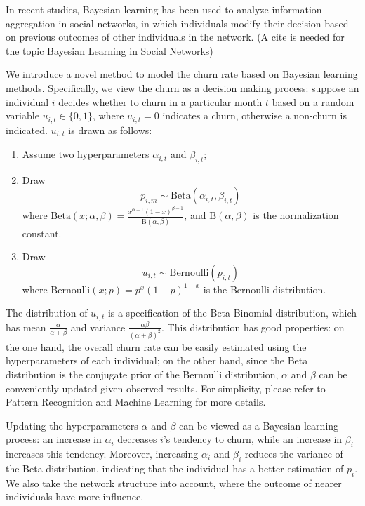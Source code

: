 In recent studies, Bayesian learning has been used to analyze information aggregation in social networks, in which individuals modify their decision based on previous outcomes of other individuals in the network. (A cite is needed for the topic Bayesian Learning in Social Networks)

We introduce a novel method to model the churn rate based on Bayesian learning methods. Specifically, we view the churn as a decision making process: suppose an individual $i$ decides whether to churn in a particular month $t$ based on a random variable $u_{i,t} \in \{0, 1\}$, where $u_{i,t} = 0$ indicates a churn, otherwise a non-churn is indicated. $u_{i, t}$ is drawn as follows:
\begin{enumerate}
\item Assume two hyperparameters $\alpha_{i, t}$ and $\beta_{i, t}$;
\item Draw 
  \begin{equation}
   p_{i, m} \sim \mathrm{Beta}(\alpha_{i, t}, \beta_{i, t})
   \label{eq:beta}
  \end{equation}
  where $\displaystyle \mathrm{Beta}(x; \alpha, \beta) = \frac{x^{\alpha - 1}(1-x)^{\beta - 1}}{\mathrm{B}(\alpha, \beta)}$, and $\mathrm{B}(\alpha, \beta)$ is the normalization constant.
\item Draw 
  \begin{equation}
	u_{i, t} \sim \mathrm{Bernoulli}(p_{i, t})
    \label{eq:bernoulli}
  \end{equation}
  where $\mathrm{Bernoulli}(x; p) = p^x(1-p)^{1-x}$ is the Bernoulli distribution.
\end{enumerate}

The distribution of $u_{i, t}$ is a specification of the Beta-Binomial distribution, which has mean $\displaystyle \frac{\alpha}{\alpha + \beta}$ and variance $\displaystyle\frac{\alpha\beta}{(\alpha+\beta)^2}$. This distribution has good properties: on the one hand, the overall churn rate can be easily estimated using the hyperparameters of each individual; on the other hand, since the Beta distribution is the conjugate prior of the Bernoulli distribution, $\alpha$ and $\beta$ can be conveniently updated given observed results. For simplicity, please refer to Pattern Recognition and Machine Learning for more details.

Updating the hyperparameters $\alpha$ and $\beta$ can be viewed as a Bayesian learning process: an increase in $\alpha_i$ decreases $i$'s tendency to churn, while an increase in $\beta_i$ increases this tendency. Moreover, increasing $\alpha_i$ and $\beta_i$ reduces the variance of the Beta distribution, indicating that the individual has a better estimation of $p_i$. We also take the network structure into account, where the outcome of nearer individuals have more influence.


